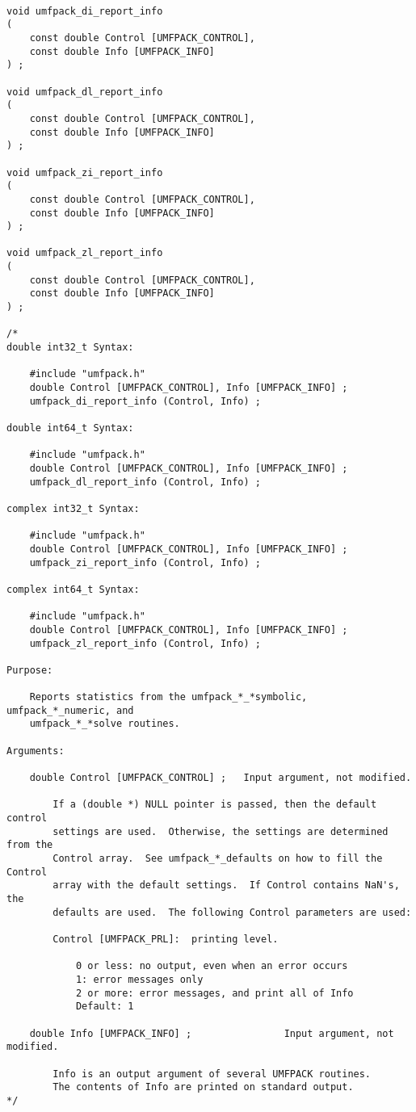 \documentclass[11pt]{article}
\begin{document}
{\footnotesize
\begin{verbatim}

void umfpack_di_report_info
(
    const double Control [UMFPACK_CONTROL],
    const double Info [UMFPACK_INFO]
) ;

void umfpack_dl_report_info
(
    const double Control [UMFPACK_CONTROL],
    const double Info [UMFPACK_INFO]
) ;

void umfpack_zi_report_info
(
    const double Control [UMFPACK_CONTROL],
    const double Info [UMFPACK_INFO]
) ;

void umfpack_zl_report_info
(
    const double Control [UMFPACK_CONTROL],
    const double Info [UMFPACK_INFO]
) ;

/*
double int32_t Syntax:

    #include "umfpack.h"
    double Control [UMFPACK_CONTROL], Info [UMFPACK_INFO] ;
    umfpack_di_report_info (Control, Info) ;

double int64_t Syntax:

    #include "umfpack.h"
    double Control [UMFPACK_CONTROL], Info [UMFPACK_INFO] ;
    umfpack_dl_report_info (Control, Info) ;

complex int32_t Syntax:

    #include "umfpack.h"
    double Control [UMFPACK_CONTROL], Info [UMFPACK_INFO] ;
    umfpack_zi_report_info (Control, Info) ;

complex int64_t Syntax:

    #include "umfpack.h"
    double Control [UMFPACK_CONTROL], Info [UMFPACK_INFO] ;
    umfpack_zl_report_info (Control, Info) ;

Purpose:

    Reports statistics from the umfpack_*_*symbolic, umfpack_*_numeric, and
    umfpack_*_*solve routines.

Arguments:

    double Control [UMFPACK_CONTROL] ;   Input argument, not modified.

        If a (double *) NULL pointer is passed, then the default control
        settings are used.  Otherwise, the settings are determined from the
        Control array.  See umfpack_*_defaults on how to fill the Control
        array with the default settings.  If Control contains NaN's, the
        defaults are used.  The following Control parameters are used:

        Control [UMFPACK_PRL]:  printing level.

            0 or less: no output, even when an error occurs
            1: error messages only
            2 or more: error messages, and print all of Info
            Default: 1

    double Info [UMFPACK_INFO] ;                Input argument, not modified.

        Info is an output argument of several UMFPACK routines.
        The contents of Info are printed on standard output.
*/
\end{verbatim}
}
\end{document}
